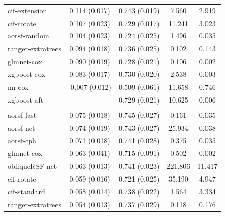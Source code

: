 \documentclass[twoside,11pt]{article}\usepackage[]{graphicx}\usepackage[]{xcolor}
\newenvironment{knitrout}{}{} %
\begin{document}
\begin{knitrout}
\begin{longtable}[t]{lcccc}
\hspace{1em}cif-extension & 0.114 (0.017) & 0.743 (0.019) & 7.560 & 2.919\\
\hspace{1em}cif-rotate & 0.107 (0.023) & 0.729 (0.017) & 11.241 & 3.023\\
\hspace{1em}aorsf-random & 0.104 (0.023) & 0.724 (0.025) & 1.496 & 0.035\\
\hspace{1em}ranger-extratrees & 0.094 (0.018) & 0.736 (0.025) & 0.102 & 0.143\\
\hspace{1em}glmnet-cox & 0.090 (0.019) & 0.728 (0.021) & 0.106 & 0.002\\
\hspace{1em}xgboost-cox & 0.083 (0.017) & 0.730 (0.020) & 2.538 & 0.003\\
\hspace{1em}nn-cox & -0.007 (0.012) & 0.509 (0.061) & 11.658 & 0.746\\
\hspace{1em}xgboost-aft & --- & 0.729 (0.021) & 10.625 & 0.006\\
\addlinespace[0.3em]
\multicolumn{5}{l}{\textit{\textbf{GUIDE-IT; CVD death, n = 894, p = 59}}}\\
\hline
\hspace{1em}aorsf-fast & 0.075 (0.018) & 0.745 (0.027) & 0.161 & 0.035\\
\hspace{1em}aorsf-net & 0.074 (0.019) & 0.743 (0.027) & 25.934 & 0.038\\
\hspace{1em}aorsf-cph & 0.071 (0.018) & 0.741 (0.028) & 0.375 & 0.035\\
\hspace{1em}glmnet-cox & 0.063 (0.041) & 0.715 (0.091) & 0.502 & 0.002\\
\hspace{1em}obliqueRSF-net & 0.063 (0.013) & 0.741 (0.023) & 221.806 & 11.417\\
\hspace{1em}cif-rotate & 0.059 (0.016) & 0.721 (0.025) & 35.190 & 4.947\\
\hspace{1em}cif-standard & 0.058 (0.014) & 0.738 (0.022) & 1.564 & 3.334\\
\hspace{1em}ranger-extratrees & 0.054 (0.013) & 0.737 (0.029) & 0.118 & 0.176\\

\end{longtable}
\end{knitrout}
\end{document}
